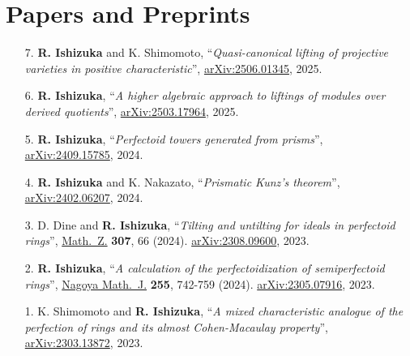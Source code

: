 \documentclass[10pt,a4paper,sans]{moderncv}
\begin{document}
\section{Papers and Preprints}
\begin{enumerate}
  \item[7.] \textbf{R. Ishizuka} and K. Shimomoto,  ``\emph{Quasi-canonical lifting of projective varieties in positive characteristic}'', \href{https://arxiv.org/abs/2506.01345}{arXiv:2506.01345}, 2025.

  \item[6.] \textbf{R. Ishizuka}, ``\emph{A higher algebraic approach to liftings of modules over derived quotients}'', \href{https://arxiv.org/abs/2503.17964}{arXiv:2503.17964}, 2025.

  \item[5.] \textbf{R. Ishizuka}, ``\emph{Perfectoid towers generated from prisms}'', \href{https://arxiv.org/abs/2409.15785}{arXiv:2409.15785}, 2024.

  \item[4.] \textbf{R. Ishizuka} and K. Nakazato, ``\emph{Prismatic Kunz's theorem}'', \href{https://arxiv.org/abs/2402.06207}{arXiv:2402.06207}, 2024.

  \item[3.] D. Dine and \textbf{R. Ishizuka}, ``\emph{Tilting and untilting for ideals in perfectoid rings}'', \href{https://doi.org/10.1007/s00209-024-03537-1}{Math.\ Z.} \textbf{307}, 66 (2024). \href{https://arxiv.org/abs/2308.09600}{arXiv:2308.09600}, 2023.

  \item[2.] \textbf{R. Ishizuka}, ``\emph{A calculation of the perfectoidization of semiperfectoid rings}'', \href{https://doi.org/10.1017/nmj.2024.2}{Nagoya Math.\ J.} \textbf{255}, 742-759 (2024). \href{https://arxiv.org/abs/2305.07916}{arXiv:2305.07916}, 2023.

  \item[1.] K. Shimomoto and \textbf{R. Ishizuka}, ``\emph{A mixed characteristic analogue of the perfection of rings and its almost Cohen-Macaulay property}'', \href{https://arxiv.org/abs/2303.13872}{arXiv:2303.13872}, 2023.
\end{enumerate}


\end{document}

